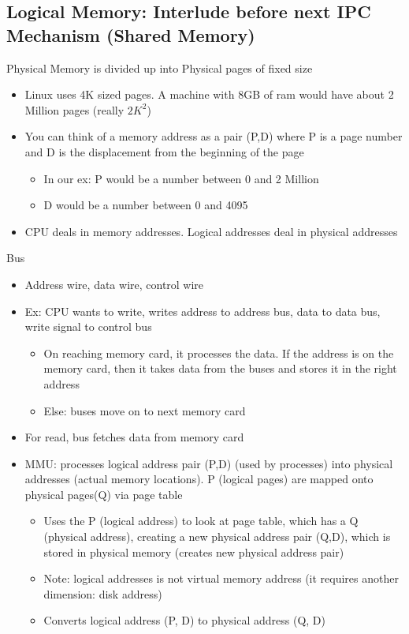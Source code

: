 \subsection{Logical Memory: Interlude before next IPC Mechanism (Shared Memory)}
Physical Memory is divided up into Physical pages of fixed size
\begin{itemize}
    \item Linux uses 4K sized pages. A machine with 8GB of ram would have about 2 Million pages (really $2K^2$)
    \item You can think of a memory address as a pair (P,D) where P is a page number and D is the displacement from the beginning of the page
    \begin{itemize}
        \item In our ex: P would be a number between 0 and 2 Million
        \item D would be a number between 0 and 4095
    \end{itemize}
    \item CPU deals in memory addresses. Logical addresses deal in physical addresses
\end{itemize}
Bus
\begin{itemize}
    \item Address wire, data wire, control wire
    \item Ex: CPU wants to write, writes address to address bus, data to data bus, write signal to control bus
    \begin{itemize}
        \item On reaching memory card, it processes the data. If the address is on the memory card, then it takes data from the buses and stores it in the right address
        \item Else: buses move on to next memory card
    \end{itemize}
    \item For read, bus fetches data from memory card
    \item MMU: processes logical address pair (P,D) (used by processes) into physical addresses (actual memory locations). P (logical pages) are mapped onto physical pages(Q) via page table
    \begin{itemize}
        \item Uses the P (logical address) to look at page table, which has a Q (physical address), creating a new physical address pair (Q,D), which is stored in physical memory (creates new physical address pair)
        \item Note: logical addresses is not virtual memory address (it requires another dimension: disk address)
        \item Converts logical address (P, D) to physical address (Q, D)
    \end{itemize}
\end{itemize}

